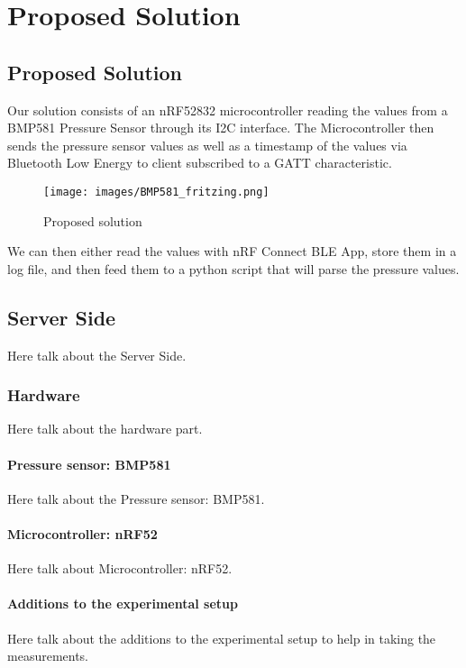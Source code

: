 \chapter{Proposed Solution}
\section{Proposed Solution}
Our solution consists of an nRF52832 microcontroller reading the values from a BMP581 Pressure Sensor through its I2C interface. The Microcontroller then sends the pressure sensor values as well as a timestamp of the values via Bluetooth Low Energy to client subscribed to a GATT characteristic.

\begin{figure}[ht]
    \centering
    \texttt{[image: images/BMP581\_fritzing.png]}
    \caption{Proposed solution}
    \label{fig:solution}
\end{figure}

We can then either read the values with nRF Connect BLE App, store them in a log file, and then feed them to a python script that will parse the pressure values.

\section{Server Side}
\par
Here talk about the Server Side.

\subsection{Hardware}
\par
Here talk about the hardware part. 

\subsubsection{Pressure sensor: BMP581}
\par
Here talk about the Pressure sensor: BMP581. 

\subsubsection{Microcontroller: nRF52}
\par
Here talk about Microcontroller: nRF52. 

\subsubsection{Additions to the experimental setup}
\par
Here talk about the additions to the experimental setup to help in taking the measurements. 


